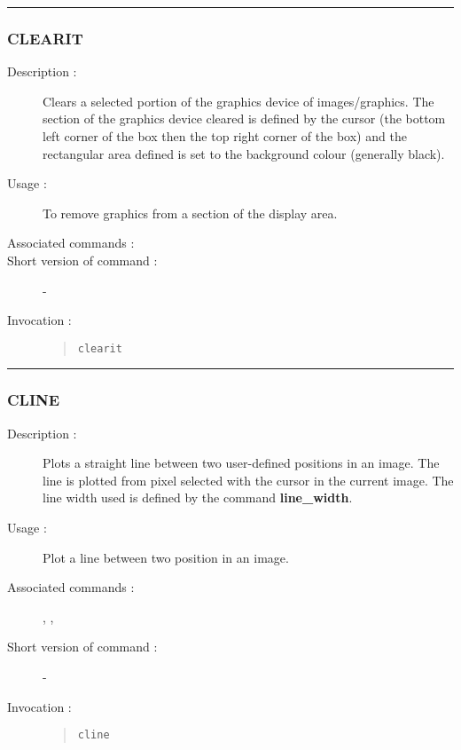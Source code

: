 \hrule 
\subsubsection*{\label{CLEARIT}CLEARIT}

\begin{description}

\item[Description :] Clears a selected portion of the graphics device
of images/graphics. The section of the graphics device cleared is
defined by the cursor (the bottom left corner of the box then the top
right corner of the box) and the rectangular area defined is set to the
background colour (generally black).

\item[Usage :] To remove graphics from a section of the display area.
\item[Associated commands :] {\tt {}}
\item[Short version of command :] -
\item[Invocation :]

\begin{quote}{\tt  clearit }\end{quote}

\end{description}

\hrule 
\subsubsection*{\label{CLINE}CLINE}

\begin{description}

\item[Description :] Plots a straight line between two user-defined
positions in an image.  The line is plotted from pixel selected with
the cursor in the current image.  The line width used is defined by the
command {\bf line\_width}.

\item[Usage :] Plot a line between two position in an image.
\item[Associated commands :] {\tt {}}, 
{\tt {}}, {\tt {}}
\item[Short version of command :] -
\item[Invocation :]

\begin{quote}{\tt  cline }\end{quote}

\end{description}

